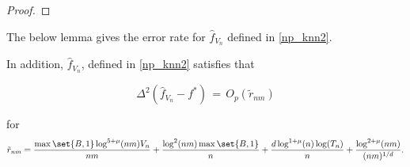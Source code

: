 \documentclass[twoside,11pt]{article}
\begin{document}
\begin{proof}
\end{proof}




The below lemma gives the error rate for $\hat{f}_{V_n}$ defined in \eqref{np_knn2}. 



    



\begin{lemma}
\label{knn_f}
In addition, \( \hat{f}_{V_n} \), defined in \eqref{np_knn2} satisfies that

\[
\Delta^2(\hat{f}_{V_n} - f^*) \,=\, O_p(\tilde{r}_{nm})
\]

for
\[
\tilde{r}_{nm} =  \frac{ \max\set{B,1} \log^{5+\mu}(nm)V_n}{nm} + \frac{\log^2(nm)\max\set{B,1}}{n}
+ \frac{d \log^{1+\mu}(n) \log(T_n)}{n} + \frac{\log^{2+\mu}(nm)}{(nm)^{1/d}}.
\]
\end{lemma}
\end{document}
